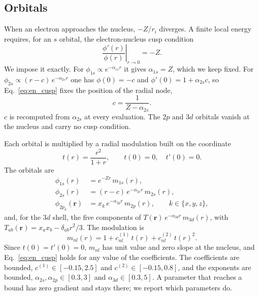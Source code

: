 \documentclass[aps,prb,reprint,amsmath,amssymb,superscriptaddress,nofootinbib]{revtex4-2}
\begin{document}
\subsection{Orbitals}
\label{ssec:orbitals}

When an electron approaches the nucleus, $-Z/r_i$ diverges. A finite local
energy requires, for an $s$ orbital, the electron-nucleus cusp
condition~\cite{kato1957}
\begin{equation}
    \left. \frac{\phi'(r)}{\phi(r)} \right|_{r\to 0} = -Z .
    \label{eq:en_cusp}
\end{equation}
We impose it exactly. For $\phi_{1s} \propto e^{-\alpha_{1s} r}$ it gives
$\alpha_{1s} = Z$, which we keep fixed. For
$\phi_{2s} \propto (r - c)\, e^{-\alpha_{2s} r}$ one has $\phi(0) = -c$ and
$\phi'(0) = 1 + \alpha_{2s} c$, so Eq.~\eqref{eq:en_cusp} fixes the position of
the radial node,
\begin{equation}
    c = \frac{1}{Z - \alpha_{2s}} .
    \label{eq:c_from_cusp}
\end{equation}
$c$ is recomputed from $\alpha_{2s}$ at every evaluation. The $2p$ and $3d$
orbitals vanish at the nucleus and carry no cusp condition.

Each orbital is multiplied by a radial modulation built on the coordinate
\begin{equation}
    t(r) = \frac{r^2}{1+r} , \qquad t(0) = 0 , \quad t'(0) = 0 .
    \label{eq:t_coordinate}
\end{equation}
The orbitals are
\begin{align}
    \phi_{1s}(r)  &= e^{-Z r}\, m_{1s}(r) ,
    \label{eq:phi1s} \\
    \phi_{2s}(r)  &= (r - c)\, e^{-\alpha_{2s} r}\, m_{2s}(r) ,
    \label{eq:phi2s} \\
    \phi_{2p_k}(\mathbf{r}) &= x_k\, e^{-\alpha_{2p} r}\, m_{2p}(r) ,
    \qquad k \in \{x, y, z\} ,
    \label{eq:phi2p}
\end{align}
and, for the $3d$ shell, the five components of
$T(\mathbf{r})\, e^{-\alpha_{3d} r}\, m_{3d}(r)$, with
$T_{ab}(\mathbf{r}) = x_a x_b - \delta_{ab} r^2/3$. The modulation is
\begin{equation}
    m_{nl}(r) = 1 + c^{(1)}_{nl}\, t(r) + c^{(2)}_{nl}\, t(r)^2 .
    \label{eq:modulation}
\end{equation}
Since $t(0) = t'(0) = 0$, $m_{nl}$ has unit value and zero slope at the
nucleus, and Eq.~\eqref{eq:en_cusp} holds for any value of the coefficients.
The coefficients are bounded, $c^{(1)} \in [-0.15, 2.5]$ and
$c^{(2)} \in [-0.15, 0.8]$, and the exponents are bounded,
$\alpha_{2s}, \alpha_{2p} \in [0.3, 3]$ and $\alpha_{3d} \in [0.3, 5]$. A
parameter that reaches a bound has zero gradient and stays there; we report
which parameters do.
\end{document}
